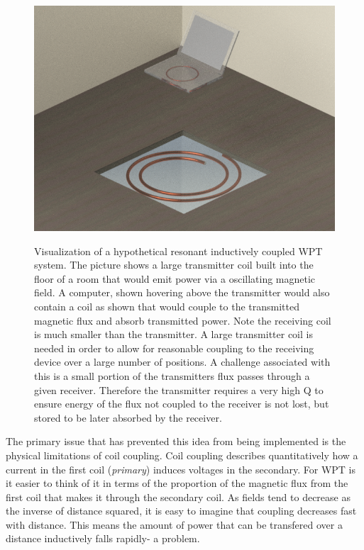 \documentclass[11pt,letterpaper]{article}
\begin{document}
\begin{figure}[!t]
	\centering
	\includegraphics[width=0.7\linewidth]{Image.png}\\
	\captionsetup{width=.7\linewidth}
	\caption{\small Visualization of a hypothetical resonant inductively coupled WPT system. The picture shows a large transmitter coil built into the floor of a room that would emit power via a oscillating magnetic field. A computer, shown hovering above the transmitter would also contain a coil as shown that would couple to the transmitted magnetic flux and absorb transmitted power. Note the receiving coil is much smaller than the transmitter. A large transmitter coil is needed in order to allow for reasonable coupling to the receiving device over a large number of positions. A challenge associated with this is a small portion of the transmitters flux passes through a given receiver. Therefore the transmitter requires a very high Q to ensure energy of the flux not coupled to the receiver is not lost, but stored to be later absorbed by the receiver.}
	\label{fig_sim}
\end{figure}
 The primary issue that has prevented this idea from being implemented is the physical limitations of coil coupling. Coil coupling describes quantitatively how a current in the first coil (\textit{primary}) induces voltages in the secondary. For WPT is it easier to think of it in terms of the proportion of the magnetic flux from the first coil that makes it through the secondary coil. As fields tend to decrease as the inverse of distance squared, it is easy to imagine that coupling decreases fast with distance. This means the amount of power that can be transfered over a distance inductively falls rapidly- a problem. \\\par 
 \FloatBarrier
\end{document}
